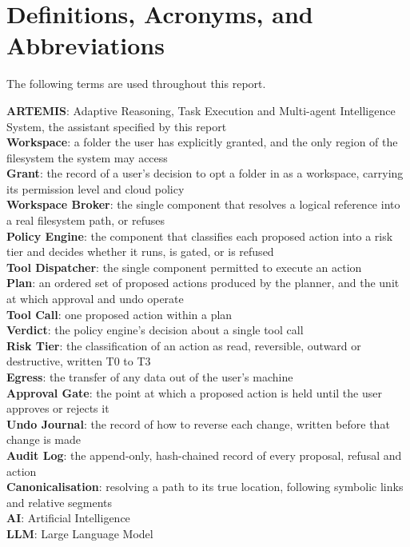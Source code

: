 \documentclass{FastFyp}
\begin{document}
\section{Definitions, Acronyms, and Abbreviations}
The following terms are used throughout this report.

\textbf{ARTEMIS}: Adaptive Reasoning, Task Execution and Multi-agent Intelligence System, the assistant specified by this report\\
\textbf{Workspace}: a folder the user has explicitly granted, and the only region of the filesystem the system may access\\
\textbf{Grant}: the record of a user's decision to opt a folder in as a workspace, carrying its permission level and cloud policy\\
\textbf{Workspace Broker}: the single component that resolves a logical reference into a real filesystem path, or refuses\\
\textbf{Policy Engine}: the component that classifies each proposed action into a risk tier and decides whether it runs, is gated, or is refused\\
\textbf{Tool Dispatcher}: the single component permitted to execute an action\\
\textbf{Plan}: an ordered set of proposed actions produced by the planner, and the unit at which approval and undo operate\\
\textbf{Tool Call}: one proposed action within a plan\\
\textbf{Verdict}: the policy engine's decision about a single tool call\\
\textbf{Risk Tier}: the classification of an action as read, reversible, outward or destructive, written T0 to T3\\
\textbf{Egress}: the transfer of any data out of the user's machine\\
\textbf{Approval Gate}: the point at which a proposed action is held until the user approves or rejects it\\
\textbf{Undo Journal}: the record of how to reverse each change, written before that change is made\\
\textbf{Audit Log}: the append-only, hash-chained record of every proposal, refusal and action\\
\textbf{Canonicalisation}: resolving a path to its true location, following symbolic links and relative segments\\
\textbf{AI}: Artificial Intelligence\\
\textbf{LLM}: Large Language Model\\
\end{document}

